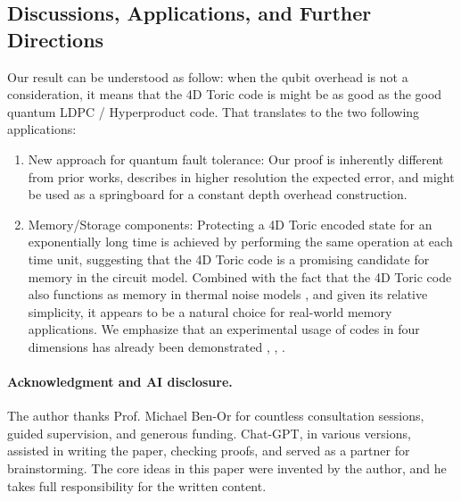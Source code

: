 \subsection{Discussions, Applications, and Further Directions}
Our result can be understood as follow: when the qubit overhead is not a consideration, it means that the 4D Toric code is might be as good as the good quantum LDPC / Hyperproduct code. That translates to the two following applications: 
\begin{enumerate}
  \item New approach for quantum fault tolerance: Our proof is inherently different from prior works, describes in higher resolution the expected error, and might be used as a springboard for a constant depth overhead construction. %
    \item Memory/Storage components: Protecting a 4D Toric encoded state for an exponentially long time is achieved by performing the same operation at each time unit, suggesting that the 4D Toric code is a promising candidate for memory in the circuit model. Combined with the fact that the 4D Toric code also functions as memory in thermal noise models \cite{alicki2008thermalstabilitytopologicalqubit}, and given its relative simplicity, it appears to be a natural choice for real-world memory applications. We emphasize that an experimental usage of codes in four dimensions has already been demonstrated \cite{aasen2025topologicallyfaulttolerantquantumcomputer}, \cite{Berthusen_2024}, \cite{reichardt2024demonstrationquantumcomputationerror}.
\end{enumerate}

\paragraph{Acknowledgment and AI disclosure.} 
The author thanks Prof. Michael Ben-Or for countless consultation sessions, guided supervision, and generous funding. Chat-GPT, in various versions, assisted in writing the paper, checking proofs, and served as a partner for brainstorming. The core ideas in this paper were invented by the author, and he takes full responsibility for the written content.





